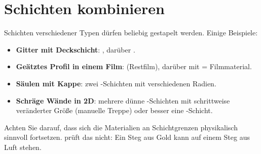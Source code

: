 \section{Schichten kombinieren}
Schichten verschiedener Typen dürfen beliebig gestapelt werden. Einige Beispiele:
\begin{itemize}
  \item \textbf{Gitter mit Deckschicht}: , darüber .
  \item \textbf{Geätztes Profil in einem Film}:  (Restfilm), darüber  mit
         = Filmmaterial.
  \item \textbf{Säulen mit Kappe}: zwei -Schichten mit verschiedenen Radien.
  \item \textbf{Schräge Wände in 2D}: mehrere dünne -Schichten mit schrittweise veränderter Größe
        (manuelle Treppe) oder besser eine -Schicht.
\end{itemize}
Achten Sie darauf, dass sich die Materialien an Schichtgrenzen physikalisch sinnvoll fortsetzen. \FG{} prüft das
nicht: Ein Steg aus Gold kann auf einem Steg aus Luft stehen.

